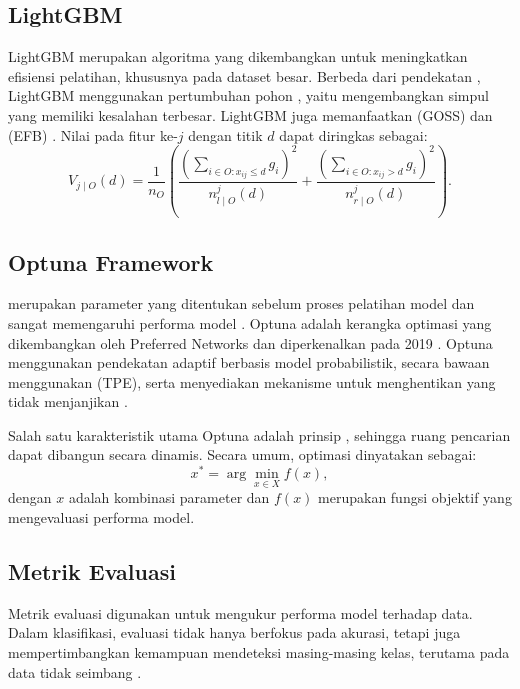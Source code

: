 \subsection{LightGBM}
LightGBM merupakan algoritma  yang dikembangkan untuk meningkatkan efisiensi pelatihan, khususnya pada dataset besar. Berbeda dari pendekatan , LightGBM menggunakan pertumbuhan pohon , yaitu mengembangkan simpul yang memiliki kesalahan terbesar. LightGBM juga memanfaatkan  (GOSS) dan  (EFB) \cite{ref13}. Nilai  pada fitur ke-$j$ dengan titik  $d$ dapat diringkas sebagai:
\begin{equation}
 V_{j\mid O}(d)=\frac{1}{n_O}\left(
 \frac{\left(\sum_{i\in O:x_{ij}\le d}g_i\right)^2}{n^{j}_{l\mid O}(d)}+
 \frac{\left(\sum_{i\in O:x_{ij}>d}g_i\right)^2}{n^{j}_{r\mid O}(d)}
 \right).
 \label{eq:lightgbm}
\end{equation}

\subsection{Optuna Framework}
 merupakan parameter yang ditentukan sebelum proses pelatihan model dan sangat memengaruhi performa model \cite{ref18}. Optuna adalah kerangka optimasi  yang dikembangkan oleh Preferred Networks dan diperkenalkan pada 2019 \cite{ref37}. Optuna menggunakan pendekatan adaptif berbasis model probabilistik, secara bawaan menggunakan  (TPE), serta menyediakan mekanisme  untuk menghentikan  yang tidak menjanjikan \cite{ref17}.

Salah satu karakteristik utama Optuna adalah prinsip , sehingga ruang pencarian dapat dibangun secara dinamis. Secara umum, optimasi  dinyatakan sebagai:
\begin{equation}
 x^{*}=\arg\min_{x\in X} f(x),
 \label{eq:optuna}
\end{equation}
dengan $x$ adalah kombinasi parameter dan $f(x)$ merupakan fungsi objektif yang mengevaluasi performa model.

\subsection{Metrik Evaluasi}
Metrik evaluasi digunakan untuk mengukur performa model terhadap data. Dalam klasifikasi, evaluasi tidak hanya berfokus pada akurasi, tetapi juga mempertimbangkan kemampuan mendeteksi masing-masing kelas, terutama pada data tidak seimbang \cite{ref16}.

